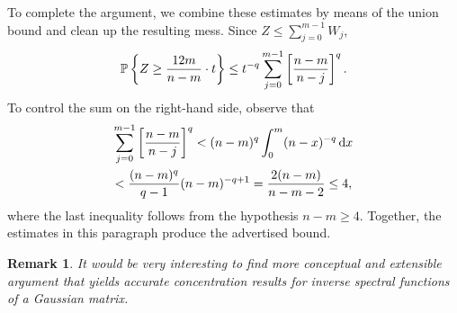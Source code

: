 \documentclass[final]{siamltex}
\newcommand{\notate}[1]{\textcolor{red}{\textbf{[#1]}}}
\newtheorem{remark}{Remark}[section]
\begin{document}
\begin{appendix}
To complete the argument, we combine these estimates by means of the union bound and clean
up the resulting mess.  Since $Z \leq \sum_{j=0}^{m-1} W_j$,
$$
\mathbb{P}\left\{ { Z \geq \frac{12m}{n-m} \cdot t } \right\}
    \leq t^{-q} \sum_{j=0}^{m-1} \left[ \frac{n-m}{n-j} \right]^q.
$$
To control the sum on the right-hand side, observe that
\begin{multline*}
\sum_{j=0}^{m-1} \left[ \frac{n-m}{n-j} \right]^q
    < (n-m)^q \int_0^m (n-x)^{-q} \, \mathrm{d}{x} \\
    < \frac{(n-m)^q}{q-1} (n-m)^{-q + 1}
    = \frac{2(n-m)}{n-m-2}
    \leq 4,
\end{multline*}
where the last inequality follows from the hypothesis $n - m \geq 4$.
Together, the estimates in this paragraph produce the advertised bound.

\lsp

\begin{remark} \rm
It would be very interesting to find more conceptual and extensible argument
that yields accurate concentration results for inverse spectral functions of
a Gaussian matrix.
\end{remark}

%
%


\end{appendix}




\end{document}
